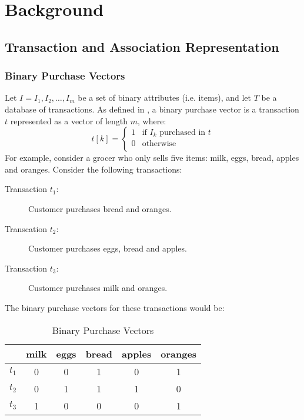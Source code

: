 \chapter{Background}

\section{Transaction and Association Representation}
\subsection{Binary Purchase Vectors}
\label{sec:binary_purchase_vectors}
Let $I = I_1, I_2,\dots,I_m$ be a set of binary attributes (i.e. items), and let $T$ be a database of transactions.
As defined in , a binary purchase vector is a transaction $t$ represented as a vector of length $m$, where:
\[
t[k] = 
\begin{cases}
1 & \text{if } I_k \text{ purchased in } t\\
0 & \text{otherwise}\\
\end{cases}
\]
For example, consider a grocer who only sells five items: milk, eggs, bread, apples and oranges.
Consider the following transactions:
\begin{description}
\item[Transaction $t_1$:] Customer purchases bread and oranges.
\item[Transcation $t_2$:] Customer purchases eggs, bread and apples.
\item[Transaction $t_3$:] Customer purchases milk and oranges.
\end{description}
The binary purchase vectors for these transactions would be:
\begin{table}[H]
\centering
\begin{tabular}{@{}cccccc@{}}

\toprule
 & milk & eggs & bread & apples & oranges \\ \midrule
$t_1$ &  0    & 0    & 1     & 0      & 1       \\ \bottomrule
$t_2$ &  0    & 1    & 1     & 1      & 0       \\ \bottomrule
$t_3$ &  1    & 0    & 0     & 0      & 1       \\ \bottomrule
\end{tabular}
\caption{Binary Purchase Vectors}
\label{tab:binary_vectors}
\end{table}
